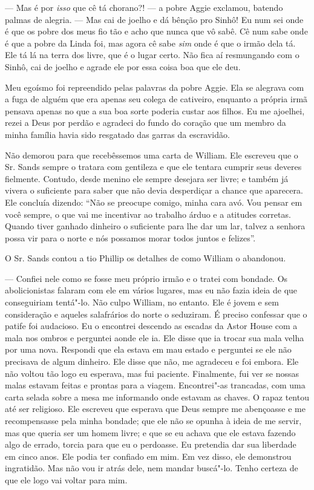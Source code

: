 --- Mas é por \emph{isso} que cê tá
chorano?! --- a pobre Aggie exclamou, batendo palmas de alegria. --- Mas
cai de joelho e dá bênção pro Sinhô! Eu num sei onde é que os pobre dos
meus fio tão e acho que nunca que vô sabê. Cê num sabe onde é que a
pobre da Linda foi, mas agora cê sabe \emph{sim} onde é que o irmão dela
tá. Ele tá lá na terra dos livre, que é o lugar certo. Não fica aí
resmungando com o Sinhô, cai de joelho e agrade ele por essa coisa boa
que ele deu.

Meu egoísmo foi repreendido pelas
palavras da pobre Aggie. Ela se alegrava com a fuga de alguém que era
apenas seu colega de cativeiro, enquanto a própria irmã pensava apenas
no que a sua boa sorte poderia custar aos filhos. Eu me ajoelhei, rezei
a Deus por perdão e agradeci do fundo do coração que um membro da minha
família havia sido resgatado das garras da escravidão.

Não demorou para que recebêssemos uma
carta de William. Ele escreveu que o Sr. Sands sempre o tratara com
gentileza e que ele tentara cumprir seus deveres fielmente. Contudo,
desde menino ele sempre desejara ser livre; e também já vivera o
suficiente para saber que não devia desperdiçar a chance que aparecera.
Ele concluía dizendo: ``Não se preocupe comigo, minha cara avó. Vou
pensar em você sempre, o que vai me incentivar ao trabalho árduo e a
atitudes corretas. Quando tiver ganhado dinheiro o suficiente para lhe
dar um lar, talvez a senhora possa vir para o norte e nós possamos morar
todos juntos e felizes''.

O Sr. Sands contou a tio Phillip os
detalhes de como William o abandonou.

--- Confiei nele como se fosse meu próprio irmão e o tratei com bondade.
Os abolicionistas falaram com ele em vários lugares, mas eu não fazia
ideia de que conseguiriam tentá"-lo. Não culpo William, no entanto. Ele é
jovem e sem consideração e aqueles salafrários do norte o seduziram. É
preciso confessar que o patife foi audacioso. Eu o encontrei descendo as
escadas da Astor House com a mala nos ombros e perguntei aonde ele ia.
Ele disse que ia trocar sua mala velha por uma nova. Respondi que ela
estava em mau estado e perguntei se ele não precisava de algum dinheiro.
Ele disse que não, me agradeceu e foi embora. Ele não voltou tão logo eu
esperava, mas fui paciente. Finalmente, fui ver se nossas malas estavam
feitas e prontas para a viagem. Encontrei"-as trancadas, com uma carta
selada sobre a mesa me informando onde estavam as chaves. O rapaz tentou
até ser religioso. Ele escreveu que esperava que Deus sempre me
abençoasse e me recompensasse pela minha bondade; que ele não se opunha
à ideia de me servir, mas que queria ser um homem livre; e que se eu
achava que ele estava fazendo algo de errado, torcia para que eu o
perdoasse. Eu pretendia dar sua liberdade em cinco anos. Ele podia ter
confiado em mim. Em vez disso, ele demonstrou ingratidão. Mas não vou ir
atrás dele, nem mandar buscá"-lo. Tenho certeza de que ele logo vai
voltar para mim.

